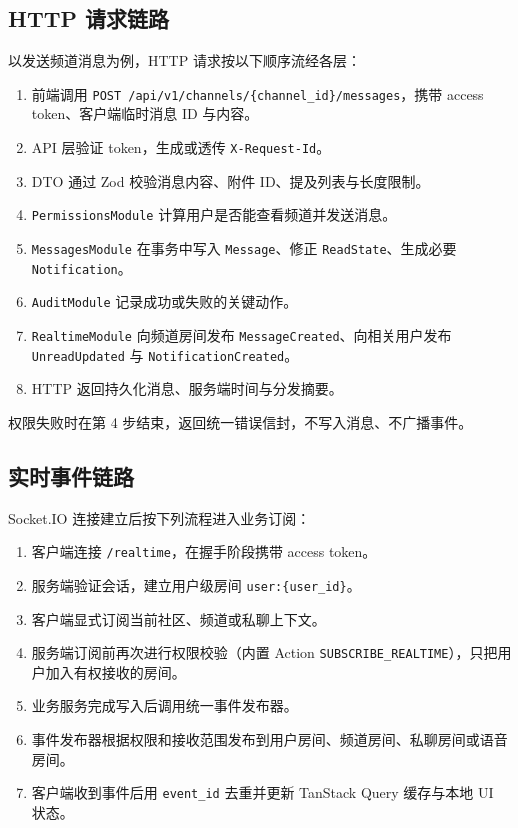 \subsection{HTTP 请求链路}

以发送频道消息为例，HTTP 请求按以下顺序流经各层：

\begin{enumerate}
  \item 前端调用 \texttt{POST /api/v1/channels/\{channel\_id\}/messages}，携带 access token、客户端临时消息 ID 与内容。
  \item API 层验证 token，生成或透传 \texttt{X-Request-Id}。
  \item DTO 通过 Zod 校验消息内容、附件 ID、提及列表与长度限制。
  \item \texttt{PermissionsModule} 计算用户是否能查看频道并发送消息。
  \item \texttt{MessagesModule} 在事务中写入 \texttt{Message}、修正 \texttt{ReadState}、生成必要 \texttt{Notification}。
  \item \texttt{AuditModule} 记录成功或失败的关键动作。
  \item \texttt{RealtimeModule} 向频道房间发布 \texttt{MessageCreated}、向相关用户发布 \texttt{UnreadUpdated} 与 \texttt{NotificationCreated}。
  \item HTTP 返回持久化消息、服务端时间与分发摘要。
\end{enumerate}

权限失败时在第 4 步结束，返回统一错误信封，不写入消息、不广播事件。

\subsection{实时事件链路}

Socket.IO 连接建立后按下列流程进入业务订阅：

\begin{enumerate}
  \item 客户端连接 \texttt{/realtime}，在握手阶段携带 access token。
  \item 服务端验证会话，建立用户级房间 \texttt{user:\{user\_id\}}。
  \item 客户端显式订阅当前社区、频道或私聊上下文。
  \item 服务端订阅前再次进行权限校验（内置 Action \texttt{SUBSCRIBE\_REALTIME}），只把用户加入有权接收的房间。
  \item 业务服务完成写入后调用统一事件发布器。
  \item 事件发布器根据权限和接收范围发布到用户房间、频道房间、私聊房间或语音房间。
  \item 客户端收到事件后用 \texttt{event\_id} 去重并更新 TanStack Query 缓存与本地 UI 状态。
\end{enumerate}

